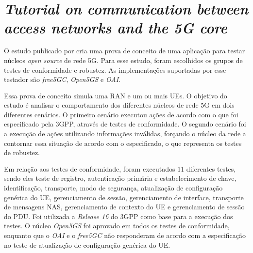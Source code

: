 \section{\textit{Tutorial on communication between access networks and the 5G core}}
\label{sec:Dominato}

O estudo publicado por \cite{Dominato2021} cria uma prova de conceito de uma aplicação para testar núcleos \textit{open source} de rede 5G.
Para esse estudo, foram escolhidos os grupos de testes de conformidade e robustez.
As implementações suportadas por esse testador são \textit{free5GC}, \textit{Open5GS} e \textit{OAI}.

Essa prova de conceito simula uma RAN e um ou mais UEs.
O objetivo do estudo é analisar o comportamento dos diferentes núcleos de rede 5G em dois diferentes cenários. O primeiro cenário executou ações de acordo com o que foi especificado pela 3GPP, através de testes de conformidade. O segundo cenário foi a execução de ações utilizando informações inválidas, forçando o núcleo da rede a contornar essa situação de acordo com o especificado, o que representa os testes de robustez.

Em relação aos testes de conformidade, foram executados 11 diferentes testes, sendo eles teste de registro, autenticação primária e estabelecimento de chave, identificação, transporte, modo de segurança, atualização de configuração genérica do UE, gerenciamento de sessão, gerenciamento de interface, transporte de mensagens NAS, gerenciamento de contexto do UE e gerenciamento de sessão do PDU.
Foi utilizada a \textit{Release 16} do 3GPP como base para a execução dos testes.
O núcleo \textit{Open5GS} foi aprovado em todos os testes de conformidade, enquanto que o \textit{OAI} e o \textit{free5GC} não responderam de acordo com a especificação no teste de atualização de configuração genérica do UE.

